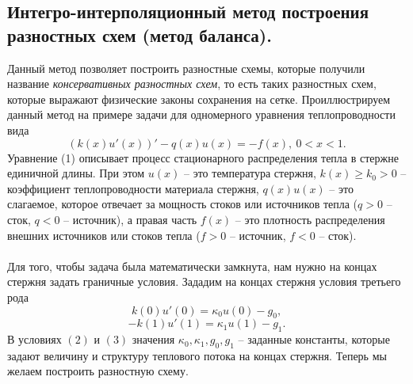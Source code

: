 \documentclass[a4paper, 12pt]{report}
\numberwithin{equation}{section}
\renewcommand{\geq}{\geqslant}
\begin{document}
		\subsection{Интегро-интерполяционный метод построения разностных схем (метод баланса).}
		Данный метод позволяет построить разностные схемы, которые получили название \textit{консервативных разностных схем}, то есть таких разностных схем, которые выражают физические законы сохранения на сетке. Проиллюстрируем данный метод на примере задачи для одномерного уравнения теплопроводности вида
		\begin{equation}
			(k(x) u'(x))' - q(x)u(x) = -f(x), \ 0<x<1.
		\end{equation}
		Уравнение (1) описывает процесс стационарного распределения тепла в стержне единичной длины.
		При этом $u(x)$ -- это температура стержня, $k(x)\geq k_0 > 0$ -- коэффициент теплопроводности материала стержня, $q(x)u(x)$ -- это слагаемое, которое отвечает за мощность стоков или источников тепла ($q>0$ -- сток, $q<0$ -- источник), а правая часть $f(x)$ -- это плотность распределения внешних источников или стоков тепла ($f>0$ -- источник, $f<0$ -- сток). \\\\
		Для того, чтобы задача была математически замкнута, нам нужно на концах стержня задать граничные условия. Зададим на концах стержня условия третьего рода
		\begin{equation}
			k(0) u'(0) = \kappa_0 u(0) - g_0,
		\end{equation}
		\begin{equation}
			- k(1) u'(1) = \kappa_1 u(1) - g_1.
		\end{equation}
		В условиях $(2)$ и $(3)$ значения $\kappa_0, \kappa_1, g_0, g_1$ -- заданные константы, которые задают величину и структуру теплового потока на концах стержня.
		Теперь мы желаем построить разностную схему. 
\end{document}
